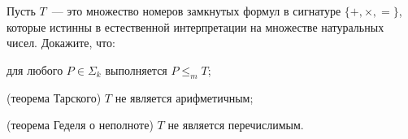 Пусть $T$~--- это множество номеров замкнутых формул в сигнатуре $\{+, \times, =\}$, которые истинны в
естественной интерпретации на множестве натуральных чисел. Докажите, что:
\begin{enumcyr}
    \item для любого $P \in \Sigma_k$ выполняется $P \le_m T$;
    \item (теорема Тарского) $T$ не является арифметичным;
    \item (теорема Геделя о неполноте) $T$ не является перечислимым.
\end{enumcyr}